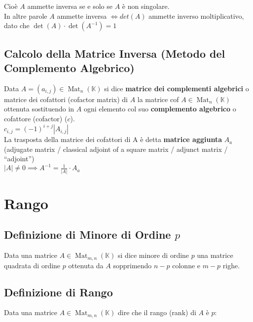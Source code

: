 \documentclass[a4paper, twoside, italian, 11pt]{book}
\newcommand{\detm}[1] {\left | #1 \right |}
\DeclareMathOperator{\Mat}{Mat}
\newcommand{\K}{\mathbb K}
\begin{document}
\noindent
Cioè $A$ ammette inversa se e solo se $A$ è non singolare. \\

\noindent
In altre parole $A$ ammette inversa $\iff det(A)$ ammette inverso moltiplicativo, dato che $\det(A) \cdot \det(A^{-1}) = 1$


\subsection{Calcolo della Matrice Inversa (Metodo del Complemento Algebrico)}

Data $A = (a_{i,j}) \in \Mat_n(\K)$ si dice \textbf{matrice dei complementi algebrici} o matrice dei cofattori (cofactor matrix) di $A$ la matrice cof $A \in \Mat_n(\K)$ ottenuta sostituendo in $A$ ogni elemento col suo \textbf{complemento algebrico} o cofattore (cofactor) ($c$). \\

\noindent
$c_{i,j} = (-1)^{i+j} \detm{A_{i,j}}$ \\

\noindent
La trasposta della matrice dei cofattori di A è detta \textbf{matrice aggiunta} $A_a$ (adjugate matrix / classical adjoint of a square matrix / adjunct matrix / ``adjoint'') \\

\noindent
$\detm A \neq 0 \implies A^{-1} = \frac{1}{\detm A} \cdot A_a$



\section{Rango}



\subsection{Definizione di Minore di Ordine $p$}

Data una matrice $A \in \Mat_{m,n}(\K)$ si dice minore di ordine $p$ una matrice quadrata di ordine $p$ ottenuta da $A$ sopprimendo $n-p$ colonne e $m-p$ righe.


\subsection{Definizione di Rango}

Data una matrice $A \in \Mat_{m,n}(\K)$ dire che il rango (rank) di $A$ è $p$: \\
\end{document}
